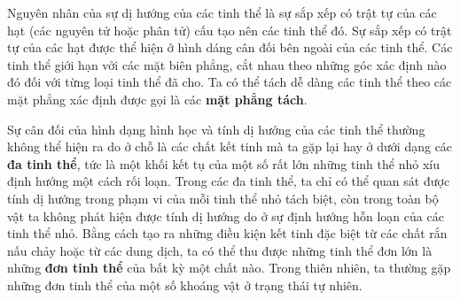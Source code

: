 
Nguyên nhân của sự dị hướng của các tinh thể là sự sắp xếp có trật tự của các hạt (các nguyên tử hoặc phân tử) cấu tạo nên các tinh thể đó. Sự sắp xếp có trật tự của các hạt được thể hiện ở hình dáng cân đối bên ngoài của các tinh thể. Các tinh thể giới hạn vởi các mặt biên phẳng, cắt nhau theo những góc xác định nào đó đối với từng loại tinh thể đã cho. Ta có thể tách dễ dàng các tinh thể theo các mặt phẳng xác định được gọi là các \textbf{mặt phẳng tách}.


Sự cân đối của hình dạng hình học và tính dị hướng của các tinh thể thường không thể hiện ra do ở chỗ là các chất kết tinh mà ta gặp lại hay ở dưới dạng các \textbf{đa tinh thể}, tức là một khối kết tụ của một số rất lớn những tinh thể nhỏ xíu định hướng một cách rối loạn. Trong các đa tinh thể, ta chỉ có thể quan sát được tính dị hướng trong phạm vi của mỗi tinh thể nhỏ tách biệt, còn trong toàn bộ vật ta không phát hiện được tính dị hướng do ở sự định hướng hỗn loạn của các tinh thể nhỏ. Bằng cách tạo ra những điều kiện kết tinh đặc biệt từ các chất rắn nấu chảy hoặc từ các dung dịch, ta có thể thu được những tinh thể đơn lớn là những \textbf{đơn tinh thể} của bất kỳ một chất nào. Trong thiên nhiên, ta thường gặp những đơn tinh thể của một số khoáng vật ở trạng thái tự nhiên.


